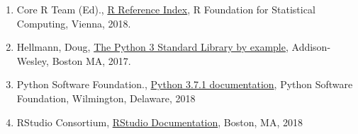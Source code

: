 \documentclass[]{book}
\theoremstyle{definition}
\theoremstyle{definition}
\theoremstyle{definition}
\theoremstyle{remark}
\begin{document}
\begin{enumerate}
\def\labelenumi{\arabic{enumi}.}
\item
  Core R Team (Ed).,
  \href{https://cran.cnr.berkeley.edu/doc/manuals/r-release/fullrefman.pdf}{R
  Reference Index}, R Foundation for Statistical Computing, Vienna,
  2018.
\item
  Hellmann, Doug,
  \href{https://www.amazon.com/Python-Standard-Library-Example-Developers-ebook/dp/B072QZZDV7}{The
  Python 3 Standard Library by example}, Addison-Wesley, Boston MA,
  2017.
\item
  Python Software Foundation.,
  \href{https://docs.python.org/3.7/}{Python 3.7.1 documentation},
  Python Software Foundation, Wilmington, Delaware, 2018
\item
  RStudio Consortium,
  \href{https://support.rstudio.com/hc/en-us/categories/200035113-Documentation}{RStudio
  Documentation}, Boston, MA, 2018
\end{enumerate}
\end{document}
